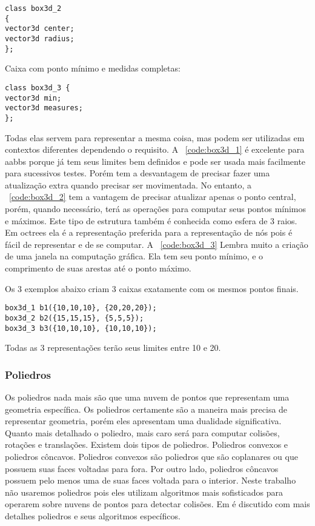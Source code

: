 \begin{lstlisting}[frame=single,caption=Exemplo de caixa 2\label{code:box3d_2}]
class box3d_2
{
vector3d center;
vector3d radius;
};
\end{lstlisting}

Caixa com ponto mínimo e medidas completas:

\begin{lstlisting}[frame=single,caption=Exemplo de caixa 3\label{code:box3d_3}]
class box3d_3 {
vector3d min;
vector3d measures;
};
\end{lstlisting}

Todas elas servem para representar a mesma coisa, mas podem ser utilizadas em
contextos diferentes dependendo o requisito. A ~\ref{code:box3d_1} é excelente para aabbs
porque já tem seus limites bem definidos e pode ser usada mais facilmente para
sucessivos testes. Porém tem a desvantagem de precisar fazer uma atualização
extra quando precisar ser movimentada.
No entanto, a ~\ref{code:box3d_2} tem a vantagem de precisar atualizar apenas o ponto
central, porém, quando necessário, terá as operações para computar seus pontos
mínimos e máximos. Este tipo de estrutura também é conhecida como esfera de 3
raios. Em octrees ela é a representação preferida para a representação de nós
pois é fácil de representar e de se computar.
A ~\ref{code:box3d_3} Lembra muito a criação de uma janela na computação gráfica. Ela tem seu
ponto mínimo, e o comprimento de suas arestas até o ponto máximo.

Os 3 exemplos abaixo criam 3 caixas exatamente com os mesmos pontos finais.

\begin{lstlisting}[frame=single,caption=Código de exemplo\label{example_box3d}]
box3d_1 b1({10,10,10}, {20,20,20});
box3d_2 b2({15,15,15}, {5,5,5});
box3d_3 b3({10,10,10}, {10,10,10});
\end{lstlisting}

Todas as 3 representações terão seus limites entre 10 e 20.


\subsubsection{Poliedros}

Os poliedros nada mais são que uma nuvem de pontos que representam uma
geometria específica. Os poliedros certamente são a maneira mais precisa de
representar geometria, porém eles apresentam uma dualidade significativa. Quanto mais
detalhado o poliedro, mais caro será para computar colisões, rotações e
translações. Existem dois tipos de poliedros. Poliedros convexos e poliedros
côncavos. Poliedros convexos são poliedros que são coplanares ou que possuem
suas faces voltadas para fora. Por outro lado, poliedros côncavos possuem
pelo menos uma de suas faces voltada para o interior.
Neste trabalho não usaremos poliedros pois eles utilizam algoritmos mais
sofisticados para operarem sobre nuvens de pontos para detectar colisões.
Em  é discutido com mais detalhes poliedros e seus algoritmos específicos.

